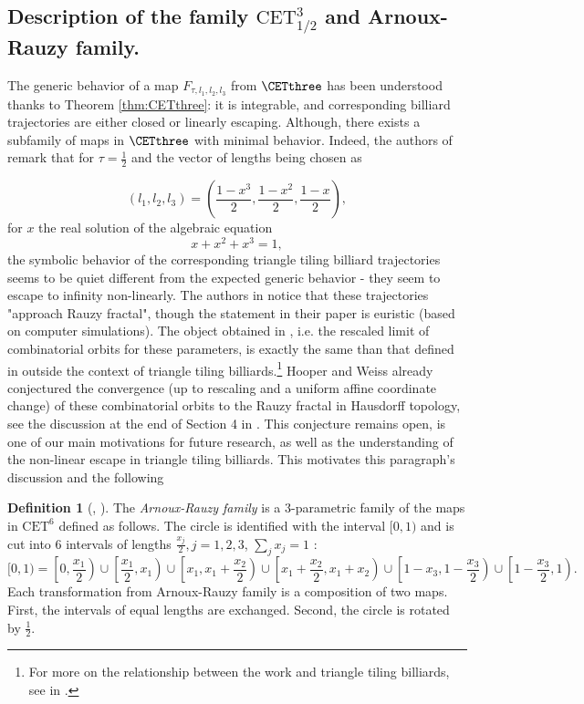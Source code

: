 \documentclass[12pt]{article}
\theoremstyle{definition}
\newtheorem{definition}{Definition}
\begin{document}
\subsection{Description of the family $\mathrm{CET}^{3}_{1/2}$ and Arnoux-Rauzy family.}\label{subs:HW_subsec}

The generic behavior of a map $F_{\tau, l_1, l_2, l_3}$ from $\CETthree$ has been understood thanks to Theorem \ref{thm:CETthree}: it is integrable, and corresponding billiard trajectories are either closed or linearly escaping. Although, there exists a subfamily of maps in $\CETthree$ with minimal behavior. Indeed, the authors of \cite{BDFI18} remark that for $\tau=\frac{1}{2}$ and the vector of lengths being chosen as

\begin{equation}\label{eq:Dianas-parameters}
(l_1,l_2, l_3)=\left(\frac{1-x^3}{2},\frac{1-x^2}{2}, \frac{1-x}{2}\right),
\end{equation}
for $x$ the real solution of the algebraic equation
\begin{equation}\label{eq:tribonacci}
x+x^2+x^3=1,
\end{equation}
the symbolic behavior of the corresponding triangle tiling billiard trajectories seems to be quiet different from the expected generic behavior - they seem to escape to infinity non-linearly. The authors in \cite{BDFI18} notice that these trajectories "approach Rauzy fractal", though the statement in their paper is euristic (based on computer simulations). The object obtained in \cite{BDFI18}, i.e. the rescaled limit of combinatorial orbits for these parameters, is exactly the same than that defined in  \cite{HW18} outside the context of triangle tiling billiards.\footnote{For more on the relationship between the work \cite{HW18} and triangle tiling billiards, see in \cite{BDFI18}.} Hooper and Weiss already conjectured the convergence (up to rescaling and a uniform affine coordinate change) of these combinatorial orbits to the Rauzy fractal in Hausdorff topology, see the discussion at the end of Section 4 in \cite{HW18}.  This conjecture remains open, is one of our main motivations for future research, as well as the understanding of the non-linear escape in triangle tiling billiards. This motivates this paragraph's discussion and the following 

\begin{definition}[\cite{A88}, \cite{AR91}]\label{def:AR}
The \emph{Arnoux-Rauzy family} is a $3$-parametric family of the maps in $\mathrm{CET}^6$ defined as follows. The circle is identified with the interval $[0,1)$ and is cut into $6$ intervals of lengths $\frac{x_j}{2}, j=1,2,3$, $\sum_j x_j=1$ : 
\begin{equation*}
[0,1)=\left[0, \frac{x_1}{2}\right) \cup \left[\frac{x_1}{2}, x_1 \right) \cup \left[x_1, x_1+\frac{x_2}{2}\right) \cup \left[x_1+\frac{x_2}{2}, x_1+x_2\right) \cup \left[1-x_3, 1-\frac{x_3}{2}\right) \cup \left[1-\frac{x_3}{2},1\right).
\end{equation*}
Each transformation from Arnoux-Rauzy family is a composition of two maps. First, the intervals of equal lengths are exchanged. Second, the circle is rotated by $\frac{1}{2}$. 
\end{definition}
\end{document}
